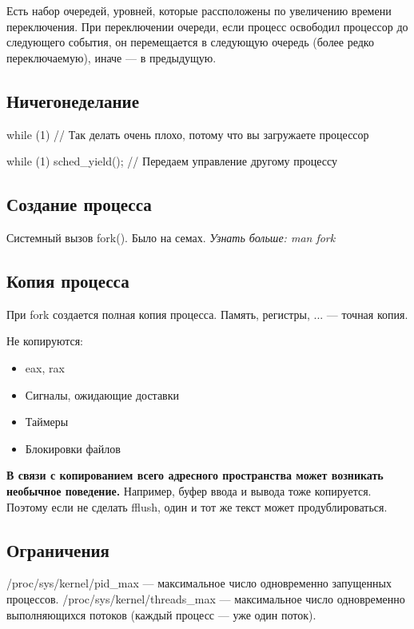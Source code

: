 Есть набор очередей, уровней, которые рассположены по увеличению времени переключения.
При переключении очереди, если процесс освободил процессор до следующего события, он
перемещается в следующую очередь (более редко переключаемую), иначе --- в предыдущую.

\subsection{Ничегонеделание}

while (1) {
	// Так делать очень плохо, потому что вы загружаете процессор
}

while (1) {
	sched\_yield(); // Передаем управление другому процессу
}

\subsection{Создание процесса}

Системный вызов fork().
Было на семах. 
\textit{Узнать больше: man fork}

\subsection{Копия процесса}

При fork создается полная копия процесса. Память, регистры, ... --- точная копия.

Не копируются:
\begin{itemize}
	\item eax, rax
	\item Сигналы, ожидающие доставки
	\item Таймеры
	\item Блокировки файлов
\end{itemize}

\textbf{В связи с копированием всего адресного пространства может возникать необычное поведение.} Например, 
буфер ввода и вывода тоже копируется. Поэтому если не сделать fflush, один и тот
же текст может продублироваться.

\subsection{Ограничения}

/proc/sys/kernel/pid\_max --- максимальное число одновременно запущенных процессов.
/proc/sys/kernel/threads\_max --- максимальное число одновременно 
выполняющихся потоков (каждый процесс --- уже один поток).

